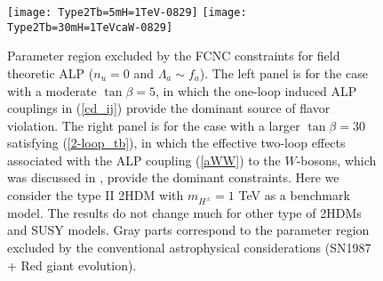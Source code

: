 \documentclass[preprint,prd,aps,tighten,nofootinbib,amssymb]{revtex4}
\begin{document}
\begin{figure}
\begin{center}
\texttt{[image: Type2Tb=5mH=1TeV-0829]}
\hspace{0.5cm}
\texttt{[image: Type2Tb=30mH=1TeVcaW-0829]}
\caption{Parameter region excluded by the FCNC constraints for field theoretic ALP ($n_u=0$ and $\Lambda_a\sim f_a$). The left panel is for the case with a moderate $\tan\beta = 5$, in which the one-loop induced ALP couplings in (\ref{cd_ij}) provide the dominant source of flavor violation. The right panel is for the case with a larger $\tan\beta=30$ satisfying (\ref{2-loop_tb}), in which
 the effective two-loop effects associated with the ALP coupling (\ref{aWW})  to the $W$-bosons, which was discussed in \cite{Izaguirre:2016dfi}, provide the dominant constraints.
 Here we consider 
the type II 2HDM with $m_{H^\pm}=1$ TeV as a benchmark model.
The results do not change much for other type of 2HDMs and SUSY models.
Gray parts correspond to the parameter region excluded by the conventional astrophysical considerations (SN1987 + Red giant evolution).
}
\label{fig:F-ALP}
\end{center}
\end{figure}
\end{document}
